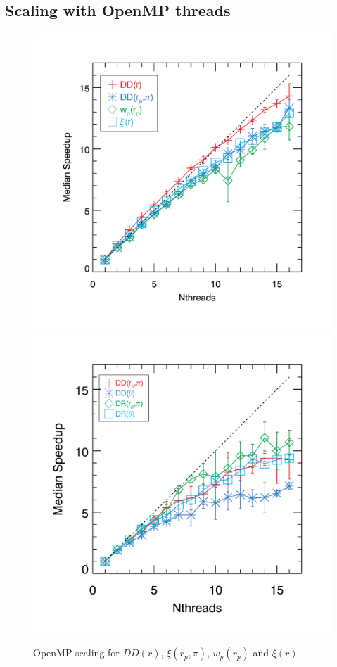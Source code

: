 \documentclass[preprint,authoryear,12pt]{elsarticle}
\newcommand{\xir}{\ensuremath{{DD(r)}}\xspace}
\newcommand{\xiofr}{\ensuremath{{\xi(r)}}\xspace}
\newcommand{\wprp}{\ensuremath{{w_p(r_p)}}\xspace}
\newcommand{\xirppi}{\ensuremath{{\xi(r_p,\pi)}}\xspace}
\begin{document}
\subsection{Scaling with OpenMP threads}
\begin{figure}[htbp]
\includegraphics[clip=true,width=0.5\linewidth]{timings_Mr19_openmp}%
\includegraphics[clip=true,width=0.5\linewidth]{timings_Mr19_mocks_openmp}
\caption{OpenMP scaling for \xir, \xirppi, \wprp and \xiofr}
\label{fig:scaling_openmp}
\end{figure}
\end{document}
